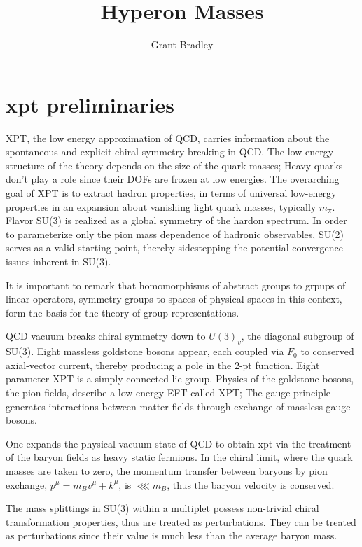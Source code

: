 \documentclass[12pt,tightenlines, raggedbottom, prd, notitlepage]{revtex4-1}
\begin{document}
\title{Hyperon Masses}
\author{Grant Bradley}
\maketitle

\section*{xpt preliminaries}

XPT, the low energy approximation of QCD, carries information about the spontaneous and explicit chiral symmetry breaking in QCD. The low energy structure
of the theory depends on the size of the quark masses; Heavy quarks don't play a role since their DOFs are frozen at low energies.  
The overarching goal of XPT is to extract hadron properties, in terms of universal low-energy properties in an expansion about vanishing light
quark masses, typically $m_\pi$. Flavor SU(3) is realized as a global symmetry of the hardon spectrum. In order to parameterize only the pion mass dependence of hadronic observables, SU(2) serves as a valid starting point,
thereby sidestepping the potential convergence issues inherent in SU(3). 

It is important to remark that homomorphisms of abstract groups to grpups of linear operators, symmetry groups to spaces of
physical spaces in this context, form the basis for the theory of group representations. 

QCD vacuum breaks chiral symmetry down to $U(3)_v$, the diagonal subgroup of SU(3). Eight massless goldstone bosons appear,
each coupled via $F_0$ to conserved axial-vector current, thereby producing a pole in the 2-pt function. Eight parameter XPT is a simply connected
lie group.  Physics of the goldstone bosons, the pion fields, describe a low energy EFT called XPT; 
The gauge principle generates interactions between matter fields through exchange of massless gauge bosons.   
  
One expands the physical vacuum state of QCD to obtain xpt via the treatment of the baryon fields as heavy static fermions.
In the chiral limit, where the quark masses are taken to zero, the momentum transfer between baryons by pion exchange, $p^\mu = m_Bv^\mu + k^\mu$,
is $\lll m_B$, thus the baryon velocity is conserved.

The mass splittings in SU(3) within a multiplet possess non-trivial chiral transformation properties, thus are treated as perturbations.
They can be treated as perturbations since their value is much less than the average baryon mass.
\end{document}
